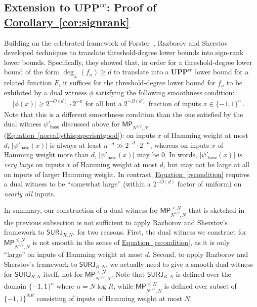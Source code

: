 \documentclass[11pt]{article}
\numberwithin{equation}{section}
\theoremstyle{definition}
\theoremstyle{plain}
\newcommand{\expref}[2]{\hyperref[#2]{#1~\ref{#2}}}
\newcommand{\expeqref}[2]{\hyperref[#2]{#1~\eqref{#2}}}
\newcommand{\SURJ}{\mathsf{ SURJ}}
\newcommand{\bits}{\{-1,1\}}
\newcommand{\UPPcc}{\mathbf{UPP}^{\text{cc}}}
\begin{document}
\subsection{Extension to \texorpdfstring{$\UPPcc$}{UPPcc}: 
Proof of \expref{Corollary}{cor:signrank}}
\label{igivethefrigup}
Building on the celebrated framework of Forster~\cite{forster}, Razborov and Sherstov~\cite{razborovsherstov} developed
techniques to translate threshold-degree %
lower bounds into sign-rank lower bounds. Specifically, they showed that, in order for a threshold-degree %
lower bound of the form $\deg_{\pm}(f_n) \geq d$ to translate into a $\UPPcc$ lower bound for a related function $F$,
it suffices for the threshold-degree %
lower bound for $f_n$ to be exhibited by a dual witness $\phi$
satisfying the following smoothness condition:
\begin{align} |\phi(x)| \geq 2^{-O(d)} \cdot 2^{-n} \text{ for all but a } 2^{-\Omega(d)} \text{ fraction of inputs } x \in \bits^n\,. \label{rscondition}\end{align} 
Note
that this is a different smoothness condition than the one satisfied by the dual witness $\psi'_{\textsf{base}}$ discussed above for $\mathsf{MP}_{N^{1/2}, N}$
%
(\expeqref{Equation}{noreallythispaperisntgood}): %
on inputs $x$ of Hamming weight at most $d$,
$|\psi'_{\textsf{base}}(x)|$ is always at least $n^{-d} \gg 2^{-d} \cdot 2^{-n}$, whereas on inputs $x$ of Hamming weight more than $d$, $|\psi'_{\textsf{base}}(x)|$ may be 0.
In words, $|\psi'_{\textsf{base}}(x)|$ is \emph{very large} on inputs $x$ of Hamming weight at most $d$, but may not be large at all on inputs of larger Hamming weight.
In contrast, \expeqref{Equation}{rscondition} requires a dual witness to be ``somewhat large'' (within a $2^{-O(d)}$ factor of uniform) on \emph{nearly all} inputs. 


In summary, our construction of a dual witness 
for $\mathsf{MP}^{\leq N}_{N^{1/2}, N}$ that is sketched in the previous subsection is not sufficient to apply
Razborov and Sherstov's framework
to $\SURJ_{R, N}$, for two reasons.
First, the dual witness we construct for  $\mathsf{MP}_{N^{1/2}, N}^{\leq N}$ 
is not smooth in the sense of \expeqref{Equation}{rscondition}, as it is only ``large'' on inputs of Hamming weight at most $d$.
Second, 
to apply Razborov and Sherstov's framework to $\SURJ_{R, N}$, we actually need to give a smooth dual witness for $\SURJ_{R, N}$ itself, not for $\mathsf{MP}^{\leq N}_{N^{1/2}, N}$. Note that
$\SURJ_{R, N}$ is defined over the domain $\bits^n$ where $n=N \log R$, while $\mathsf{MP}_{N^{1/2}, N}^{\leq N}$ is defined over subset of $\bits^{NR}$ 
consisting of inputs of Hamming weight at most $N$.
\end{document}
